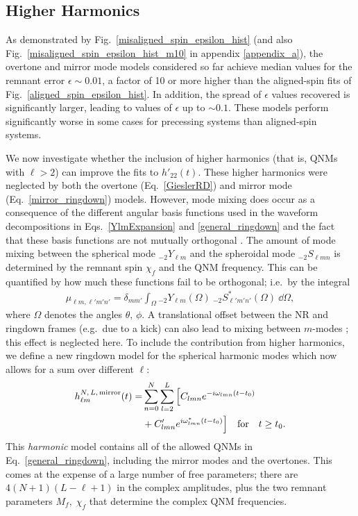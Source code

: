 \subsection{Higher Harmonics}\label{kitchen-sink}

As demonstrated by Fig.~\ref{misaligned_spin_epsilon_hist} (and also Fig.~\ref{misaligned_spin_epsilon_hist_m10} in appendix \ref{appendix_a}), the overtone and mirror mode models considered so far achieve median values for the remnant error $\epsilon \sim 0.01$, a factor of 10 or more higher than the aligned-spin fits of Fig.~\ref{aligned_spin_epsilon_hist}. In addition, the spread of $\epsilon$ values recovered is significantly larger, leading to values of $\epsilon$ up to $\sim 0.1$. 
These models perform significantly worse in some cases for precessing systems than aligned-spin systems.

We now investigate whether the inclusion of higher harmonics (that is, QNMs with $\ell > 2$) can improve the fits to $h'_{22}(t)$.
These higher harmonics were neglected by both the overtone (Eq.~\ref{GieslerRD}) and mirror mode (Eq.~\ref{mirror_ringdown}) models.
However, mode mixing does occur as a consequence of the different angular basis functions used in the waveform decompositions in Eqs.~\ref{YlmExpansion} and \ref{general_ringdown} and the fact that these basis functions are not mutually orthogonal \cite{2014PhRvD..90f4012B}.
The amount of mode mixing between the spherical mode ${}_{-2}Y_{\ell m}$ and the spheroidal mode ${}_{-2}S_{\ell m n}$ is determined by the remnant spin $\chi_f$ and the QNM frequency. This can be quantified by how much these functions fail to be orthogonal; i.e.\ by the integral
\begin{align}
     \mu_{\ell m, \ell' m' n'} = \delta_{mm'}\int_{\Omega} {}_{-2}Y_{\ell m}(\Omega)  ~ {}_{-2}S^*_{\ell ' m' n'}(\Omega) ~ \dd{\Omega},
\end{align}
where $\Omega$ denotes the angles $\theta,\,\phi$.
A translational offset between the NR and ringdown frames (e.g.\ due to a kick) can also lead to mixing between $m$-modes \cite{2016PhRvD..93h4031B}; this effect is neglected here.
To include the contribution from higher harmonics, we define a new ringdown model for the spherical harmonic modes which now allows for a sum over different $\ell$:
\begin{align}\label{full_ringdown}
    h_{\ell m}^{N,\,L,\, {\rm mirror}}(t) = &\sum_{n=0}^N \sum_{l=2}^{L} \Big[ C_{l m n} e^{-i \omega_{l m n}(t-t_0)} \\ &+ C'_{l m n} e^{i \omega^*_{l m n}(t-t_0)} \Big]\quad \textrm{for} \quad t \geq t_0. \nonumber
\end{align}
This \emph{harmonic} model contains all of the allowed QNMs in Eq.~\ref{general_ringdown}, including the mirror modes and the overtones.
This comes at the expense of a large number of free parameters; there are $4(N+1)(L-\ell+1)$ in the complex amplitudes, plus the two remnant parameters $M_f,\; \chi_f$ that determine the complex QNM frequencies.

